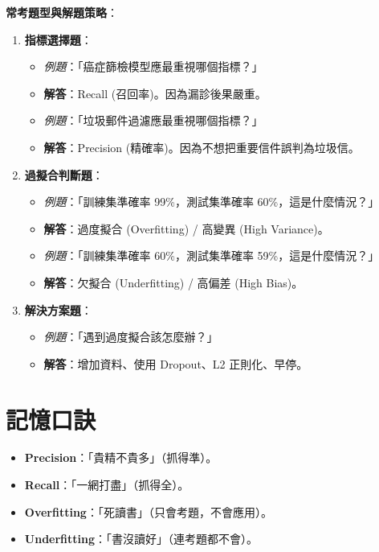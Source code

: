 \documentclass[
  letterpaper,
  DIV=11,
  numbers=noendperiod]{scrreprt}
\providecommand{\tightlist}{%
  \setlength{\itemsep}{0pt}\setlength{\parskip}{0pt}}
\begin{document}
\textbf{常考題型與解題策略}：

\begin{enumerate}
\def\labelenumi{\arabic{enumi}.}
\tightlist
\item
  \textbf{指標選擇題}：

  \begin{itemize}
  \tightlist
  \item
    \emph{例題}：「癌症篩檢模型應最重視哪個指標？」
  \item
    \textbf{解答}：Recall (召回率)。因為漏診後果嚴重。
  \item
    \emph{例題}：「垃圾郵件過濾應最重視哪個指標？」
  \item
    \textbf{解答}：Precision (精確率)。因為不想把重要信件誤判為垃圾信。
  \end{itemize}
\item
  \textbf{過擬合判斷題}：

  \begin{itemize}
  \tightlist
  \item
    \emph{例題}：「訓練集準確率 99\%，測試集準確率
    60\%，這是什麼情況？」
  \item
    \textbf{解答}：過度擬合 (Overfitting) / 高變異 (High Variance)。
  \item
    \emph{例題}：「訓練集準確率 60\%，測試集準確率
    59\%，這是什麼情況？」
  \item
    \textbf{解答}：欠擬合 (Underfitting) / 高偏差 (High Bias)。
  \end{itemize}
\item
  \textbf{解決方案題}：

  \begin{itemize}
  \tightlist
  \item
    \emph{例題}：「遇到過度擬合該怎麼辦？」
  \item
    \textbf{解答}：增加資料、使用 Dropout、L2 正則化、早停。
  \end{itemize}
\end{enumerate}

\section{記憶口訣}\label{ux8a18ux61b6ux53e3ux8a23-8}

\begin{itemize}
\tightlist
\item
  \textbf{Precision}：「貴精不貴多」（抓得準）。
\item
  \textbf{Recall}：「一網打盡」（抓得全）。
\item
  \textbf{Overfitting}：「死讀書」（只會考題，不會應用）。
\item
  \textbf{Underfitting}：「書沒讀好」（連考題都不會）。
\end{itemize}
\end{document}
